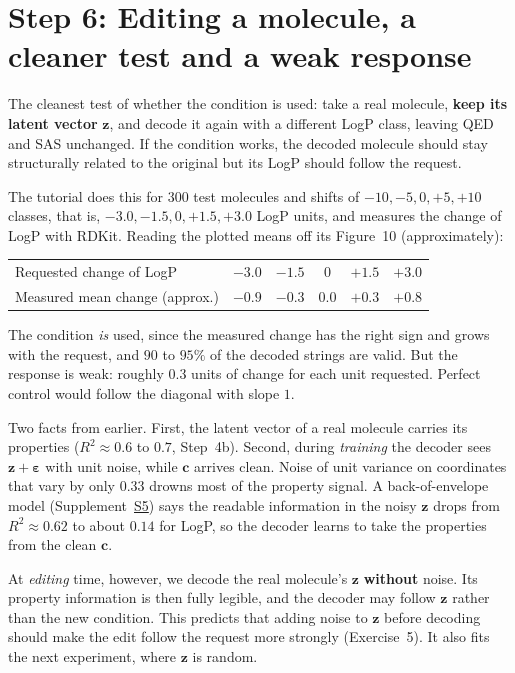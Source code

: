 \documentclass[11pt]{article}
\begin{document}
\section{Step 6: Editing a molecule, a cleaner test and a weak response}
The cleanest test of whether the condition is used: take a real molecule, \textbf{keep its latent vector} $\bm z$, and decode it again with a different LogP class, leaving QED and SAS unchanged. If the condition works, the decoded molecule should stay structurally related to the original but its LogP should follow the request.

The tutorial does this for $300$ test molecules and shifts of $-10,-5,0,+5,+10$ classes, that is, $-3.0,-1.5,0,+1.5,+3.0$ LogP units, and measures the change of LogP with RDKit. Reading the plotted means off its Figure~10 (approximately):

\begin{center}
\small
\begin{tabular}{@{}lccccc@{}}
\toprule
Requested change of LogP & $-3.0$ & $-1.5$ & $0$ & $+1.5$ & $+3.0$\\
Measured mean change (approx.) & $-0.9$ & $-0.3$ & $0.0$ & $+0.3$ & $+0.8$\\
\bottomrule
\end{tabular}
\end{center}

The condition \emph{is} used, since the measured change has the right sign and grows with the request, and $90$ to $95\%$ of the decoded strings are valid. But the response is weak: roughly $0.3$ units of change for each unit requested. Perfect control would follow the diagonal with slope $1$.

\begin{hypbox}
Two facts from earlier. First, the latent vector of a real molecule carries its properties ($R^2\approx0.6$ to $0.7$, Step~4b). Second, during \emph{training} the decoder sees $\bm z+\bm\varepsilon$ with unit noise, while $\bm c$ arrives clean. Noise of unit variance on coordinates that vary by only $0.33$ drowns most of the property signal. A back-of-envelope model (Supplement~\hyperref[sec:S5]{S5}) says the readable information in the noisy $\bm z$ drops from $R^2\approx0.62$ to about $0.14$ for LogP, so the decoder learns to take the properties from the clean $\bm c$.

At \emph{editing} time, however, we decode the real molecule's $\bm z$ \textbf{without} noise. Its property information is then fully legible, and the decoder may follow $\bm z$ rather than the new condition. This predicts that adding noise to $\bm z$ before decoding should make the edit follow the request more strongly (Exercise~5). It also fits the next experiment, where $\bm z$ is random.
\end{hypbox}
\end{document}
